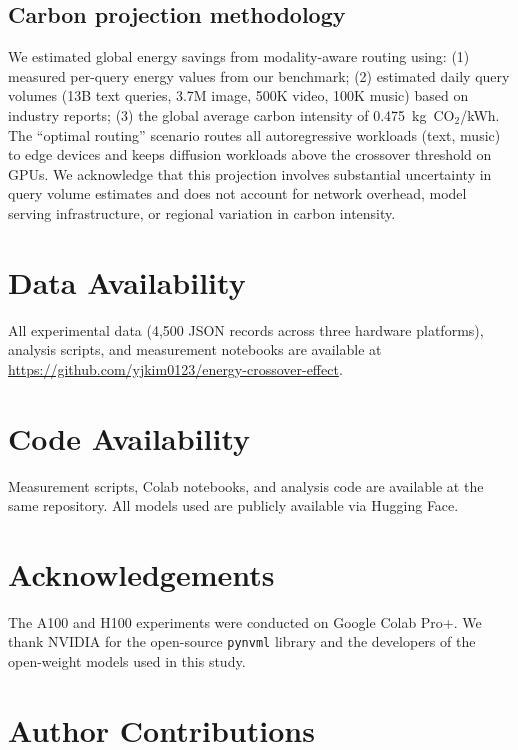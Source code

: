 \documentclass[11pt]{article}
\begin{document}
\subsection{Carbon projection methodology}

We estimated global energy savings from modality-aware routing using: (1) measured per-query energy values from our benchmark; (2) estimated daily query volumes (13B text queries\cite{devries2023growing}, 3.7M image, 500K video, 100K music) based on industry reports; (3) the global average carbon intensity of 0.475~kg~CO$_2$/kWh\cite{iea2024}. The ``optimal routing'' scenario routes all autoregressive workloads (text, music) to edge devices and keeps diffusion workloads above the crossover threshold on GPUs. We acknowledge that this projection involves substantial uncertainty in query volume estimates and does not account for network overhead, model serving infrastructure, or regional variation in carbon intensity\cite{dodge2022measuring}.

\section*{Data Availability}

All experimental data (4,500 JSON records across three hardware platforms), analysis scripts, and measurement notebooks are available at \url{https://github.com/yjkim0123/energy-crossover-effect}.

\section*{Code Availability}

Measurement scripts, Colab notebooks, and analysis code are available at the same repository. All models used are publicly available via Hugging Face.

\section*{Acknowledgements}

The A100 and H100 experiments were conducted on Google Colab Pro+. We thank NVIDIA for the open-source \texttt{pynvml} library and the developers of the open-weight models used in this study.

\section*{Author Contributions}
\end{document}
